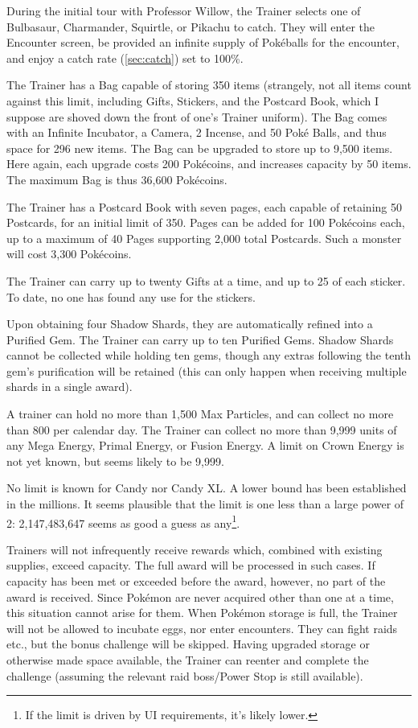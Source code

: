 During the initial tour with Professor Willow, the Trainer selects one of
 Bulbasaur, Charmander, Squirtle, or Pikachu to catch.
They will enter the Encounter screen, be provided an infinite supply of
  Pokéballs for the encounter, and enjoy a catch rate (\autoref{sec:catch}) set to 100\%.

The Trainer has a Bag capable of storing 350 items (strangely, not all items
  count against this limit, including Gifts, Stickers, and the Postcard Book,
  which I suppose are shoved down the front of one's Trainer uniform).
The Bag comes with an Infinite Incubator, a Camera, 2 Incense, and 50 Poké Balls,
  and thus space for 296 new items.
The Bag can be upgraded to store up to 9,500 items.
Here again, each upgrade costs 200 Pokécoins, and increases capacity by 50 items.
The maximum Bag is thus 36,600 Pokécoins.

The Trainer has a Postcard Book with seven pages, each capable of retaining
 50 Postcards, for an initial limit of 350.
Pages can be added for 100 Pokécoins each, up to a maximum of 40 Pages
 supporting 2,000 total Postcards.
Such a monster will cost 3,300 Pokécoins.

The Trainer can carry up to twenty Gifts at a time, and up to 25 of each sticker.
To date, no one has found any use for the stickers.

Upon obtaining four Shadow Shards, they are automatically refined into a Purified Gem.
The Trainer can carry up to ten Purified Gems.
Shadow Shards cannot be collected while holding ten gems, though any extras
 following the tenth gem's purification will be retained (this can only
 happen when receiving multiple shards in a single award).

A trainer can hold no more than 1,500 Max Particles, and can collect no more than 800 per calendar day.
The Trainer can collect no more than 9,999 units of any Mega Energy,
 Primal Energy, or Fusion Energy.
A limit on Crown Energy is not yet known, but seems likely to be 9,999.

No limit is known for Candy nor Candy XL.
A lower bound has been established in the millions.
It seems plausible that the limit is one less than a large power of 2:
  2,147,483,647 seems as good a guess as any\footnote{If the limit is driven by UI requirements, it's likely lower.}.

Trainers will not infrequently receive rewards which, combined with existing supplies, exceed capacity.
The full award will be processed in such cases.
If capacity has been met or exceeded before the award, however, no part of the award is received.
Since Pokémon are never acquired other than one at a time, this situation cannot
 arise for them.
When Pokémon storage is full, the Trainer will not be allowed to incubate eggs,
 nor enter encounters.
They can fight raids etc., but the bonus challenge will be skipped.
Having upgraded storage or otherwise made space available, the Trainer can
 reenter and complete the challenge (assuming the relevant raid boss/Power Stop is
 still available).

